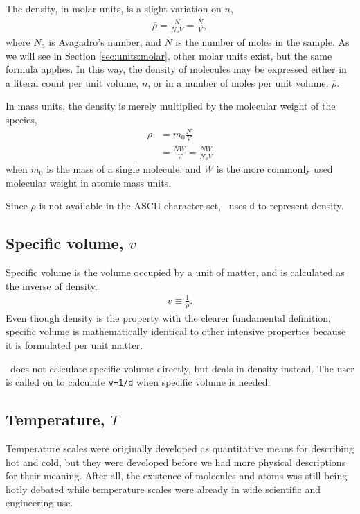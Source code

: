 The density, in molar units, is a slight variation on $n$,
\begin{align}
\overline{\rho} = \frac{N}{N_a V} = \frac{\overline{N}}{V},
\end{align}
where $N_a$ is Avagadro's number, and $\overline{N}$ is the number of moles in the sample.  As we will see in Section \ref{sec:units:molar}, other molar units exist, but the same formula applies.  In this way, the density of molecules may be expressed either in a literal count per unit volume, $n$, or in a number of moles per unit volume, $\overline{\rho}$.

In mass units, the density is merely multiplied by the molecular weight of the species,
\begin{align}
\rho &= m_0 \frac{N}{V}\\
 &= \frac{\overline{N} W}{V} = \frac{N W}{N_a V}\nonumber
\end{align}
when $m_0$ is the mass of a single molecule, and $W$ is the more commonly used molecular weight in atomic mass units.

Since $\rho$ is not available in the ASCII character set, \PM\ uses \verb|d| to represent density.

\subsection{Specific volume, $v$}

Specific volume is the volume occupied by a unit of matter, and is calculated as the inverse of density.
\begin{align}
v \equiv \frac{1}{\rho}.
\end{align}
Even though density is the property with the clearer fundamental definition, specific volume is mathematically identical to other intensive properties because it is formulated per unit matter.

\PM\ does not calculate specific volume directly, but deals in density instead.  The user is called on to calculate \verb|v=1/d| when specific volume is needed.

\subsection{Temperature, $T$}

Temperature scales were originally developed as quantitative means for describing hot and cold, but they were developed before we had more physical descriptions for their meaning.  After all, the existence of molecules and atoms was still being hotly debated while temperature scales were already in wide scientific and engineering use.


